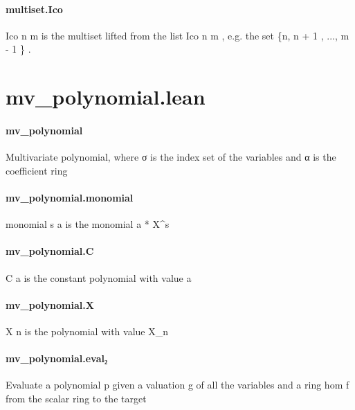 \documentclass{article}
\begin{document}
\paragraph{multiset.Ico}
\par
\colorbox[RGB]{253,246,227}{{{{\color[RGB]{101, 123, 131} Ico n m }}}} is the multiset lifted from the list 
\colorbox[RGB]{253,246,227}{{{{\color[RGB]{101, 123, 131} Ico n m }}}}, e.g. the set 
\colorbox[RGB]{253,246,227}{{{{\color[RGB]{101, 123, 131} \{n, n }}}{{{\color[RGB]{181, 137, 0} + }}}{{{\color[RGB]{108, 113, 196} 1 }}}{{{\color[RGB]{101, 123, 131} , ..., m }}}{{{\color[RGB]{181, 137, 0} - }}}{{{\color[RGB]{108, 113, 196} 1 }}}{{{\color[RGB]{101, 123, 131} \} }}}}.
\section{mv\_polynomial.lean}\paragraph{mv\_polynomial}
\par
Multivariate polynomial, where 
\colorbox[RGB]{253,246,227}{{{{\color[RGB]{101, 123, 131} σ }}}} is the index set of the variables and
\colorbox[RGB]{253,246,227}{{{{\color[RGB]{101, 123, 131} α }}}} is the coefficient ring
\paragraph{mv\_polynomial.monomial}
\par
\colorbox[RGB]{253,246,227}{{{{\color[RGB]{101, 123, 131} monomial s a }}}} is the monomial 
\colorbox[RGB]{253,246,227}{{{{\color[RGB]{101, 123, 131} a  }}}{{{\color[RGB]{181, 137, 0} * }}}{{{\color[RGB]{101, 123, 131}  X\textasciicircum{}s }}}}\paragraph{mv\_polynomial.C}
\par
\colorbox[RGB]{253,246,227}{{{{\color[RGB]{101, 123, 131} C a }}}} is the constant polynomial with value 
\colorbox[RGB]{253,246,227}{{{{\color[RGB]{101, 123, 131} a }}}}\paragraph{mv\_polynomial.X}
\par
\colorbox[RGB]{253,246,227}{{{{\color[RGB]{101, 123, 131} X n }}}} is the polynomial with value X\_n
\paragraph{mv\_polynomial.eval₂}
\par
Evaluate a polynomial 
\colorbox[RGB]{253,246,227}{{{{\color[RGB]{101, 123, 131} p }}}} given a valuation 
\colorbox[RGB]{253,246,227}{{{{\color[RGB]{101, 123, 131} g }}}} of all the variables
and a ring hom 
\colorbox[RGB]{253,246,227}{{{{\color[RGB]{101, 123, 131} f }}}} from the scalar ring to the target
\end{document}
